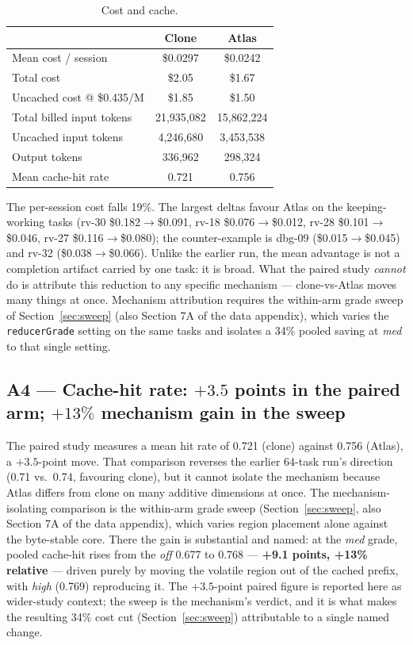 \documentclass[11pt]{article}
\begin{document}
\begin{table}[h]
\centering
\begin{tabular}{@{}lcc@{}}
\toprule
 & Clone & Atlas \\
\midrule
Mean cost / session & \$0.0297 & \$0.0242 \\
Total cost & \$2.05 & \$1.67 \\
Uncached cost @ \$0.435/M & \$1.85 & \$1.50 \\
Total billed input tokens & 21{,}935{,}082 & 15{,}862{,}224 \\
Uncached input tokens & 4{,}246{,}680 & 3{,}453{,}538 \\
Output tokens & 336{,}962 & 298{,}324 \\
Mean cache-hit rate & 0.721 & 0.756 \\
\bottomrule
\end{tabular}
\caption{Cost and cache.}
\label{tab:cost}
\end{table}

The per-session cost falls 19\%. The largest deltas favour Atlas on the keeping-working tasks (rv-30 \$0.182$\rightarrow$\$0.091, rv-18 \$0.076$\rightarrow$\$0.012, rv-28 \$0.101$\rightarrow$\$0.046, rv-27 \$0.116$\rightarrow$\$0.080); the counter-example is dbg-09 (\$0.015$\rightarrow$\$0.045) and rv-32 (\$0.038$\rightarrow$\$0.066). Unlike the earlier run, the mean advantage is not a completion artifact carried by one task: it is broad. What the paired study \emph{cannot} do is attribute this reduction to any specific mechanism --- clone-vs-Atlas moves many things at once. Mechanism attribution requires the within-arm grade sweep of Section~\ref{sec:sweep} (also Section 7A of the data appendix), which varies the \texttt{reducerGrade} setting on the same tasks and isolates a 34\% pooled saving at \emph{med} to that single setting.

\subsection{A4 --- Cache-hit rate: $+3.5$ points in the paired arm; $+13\%$ mechanism gain in the sweep}

The paired study measures a mean hit rate of 0.721 (clone) against 0.756 (Atlas), a $+3.5$-point move. That comparison reverses the earlier 64-task run's direction (0.71 vs.\ 0.74, favouring clone), but it cannot isolate the mechanism because Atlas differs from clone on many additive dimensions at once. The mechanism-isolating comparison is the within-arm grade sweep (Section~\ref{sec:sweep}, also Section 7A of the data appendix), which varies region placement alone against the byte-stable core. There the gain is substantial and named: at the \emph{med} grade, pooled cache-hit rises from the \emph{off} 0.677 to 0.768 --- \textbf{+9.1 points, +13\% relative} --- driven purely by moving the volatile region out of the cached prefix, with \emph{high} (0.769) reproducing it. The $+3.5$-point paired figure is reported here as wider-study context; the sweep is the mechanism's verdict, and it is what makes the resulting 34\% cost cut (Section~\ref{sec:sweep}) attributable to a single named change.
\end{document}
